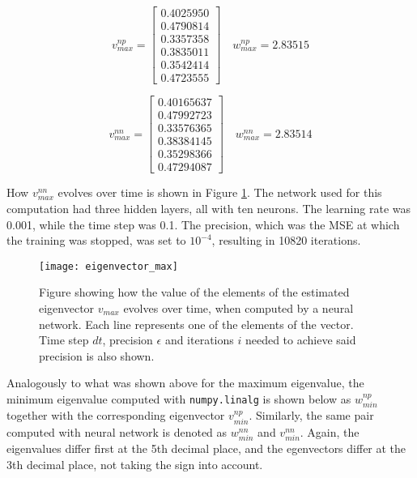 \begin{equation*}
v_{max}^{np} = \begin{bmatrix}
	0.4025950 \\
	0.4790814 \\
	0.3357358 \\
    0.3835011 \\
    0.3542414 \\
    0.4723555
\end{bmatrix} \quad w_{max}^{np} =  2.83515
\end{equation*}

\begin{equation*}
v_{max}^{nn} = \begin{bmatrix}
	0.40165637 \\
	0.47992723 \\
	0.33576365 \\
	0.38384145 \\
	0.35298366 \\
	0.47294087
\end{bmatrix} \quad w_{max}^{nn} = 2.83514
\end{equation*}

How $v_{max}^{nn}$ evolves over time is shown in Figure \ref{fig:eigenvector_max}. The network used for this computation had three hidden layers, all with ten neurons. The learning rate was 0.001, while the time step was 0.1. The precision, which was the MSE at which the training was stopped, was set to $10^{-4}$, resulting in 10820 iterations. 

 \begin{figure}[htbp]
 	\centering
 	\texttt{[image: eigenvector\_max]}
 	\caption{Figure showing how the value of the elements of the estimated eigenvector $v_{max}$ evolves over time, when computed by a neural network. Each line represents one of the elements of the vector. Time step $dt$, precision $\epsilon$ and iterations $i$ needed to achieve said precision is also shown.}
 	\label{fig:eigenvector_max}
 \end{figure}
 
 Analogously to what was shown above for the maximum eigenvalue, the minimum eigenvalue computed with \texttt{numpy.linalg} is shown below as $w_{min}^{np}$ together with the corresponding eigenvector $v_{min}^{np}$. Similarly, the same pair computed with neural network is denoted as $w_{min}^{nn}$ and $v_{min}^{nn}$. Again, the eigenvalues differ first at the 5th decimal place, and the egenvectors differ at the 3th decimal place, not taking the sign into account. 

